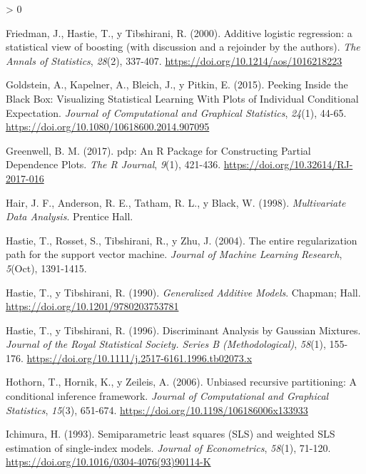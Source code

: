 \documentclass[
  spanish,
]{book}
\theoremstyle{break}
\newlength{\cslhangindent}
\newenvironment{CSLReferences}[2] %
 {%
  \setlength{\parindent}{0pt}
  \ifodd #1 \everypar{\setlength{\hangindent}{\cslhangindent}}\ignorespaces\fi
  \ifnum #2 > 0
  \setlength{\parskip}{#2\baselineskip}
  \fi
 }%
 {}
\theoremstyle{definition}
\theoremstyle{definition}
\theoremstyle{definition}
\theoremstyle{definition}
\theoremstyle{remark}
\begin{document}
\begin{CSLReferences}{1}{0}
\leavevmode\hypertarget{ref-friedman2000additive}{}%
Friedman, J., Hastie, T., y Tibshirani, R. (2000). Additive logistic regression: a statistical view of boosting (with discussion and a rejoinder by the authors). \emph{The Annals of Statistics}, \emph{28}(2), 337-407. \url{https://doi.org/10.1214/aos/1016218223}

\leavevmode\hypertarget{ref-goldstein2015peeking}{}%
Goldstein, A., Kapelner, A., Bleich, J., y Pitkin, E. (2015). Peeking Inside the Black Box: Visualizing Statistical Learning With Plots of Individual Conditional Expectation. \emph{Journal of Computational and Graphical Statistics}, \emph{24}(1), 44-65. \url{https://doi.org/10.1080/10618600.2014.907095}

\leavevmode\hypertarget{ref-greenwell2020dblp}{}%
Greenwell, B. M. (2017). {pdp: An R Package for Constructing Partial Dependence Plots}. \emph{{The R Journal}}, \emph{9}(1), 421-436. \url{https://doi.org/10.32614/RJ-2017-016}

\leavevmode\hypertarget{ref-hair1998multivariate}{}%
Hair, J. F., Anderson, R. E., Tatham, R. L., y Black, W. (1998). \emph{Multivariate Data Analysis}. Prentice Hall.

\leavevmode\hypertarget{ref-hastie2004entire}{}%
Hastie, T., Rosset, S., Tibshirani, R., y Zhu, J. (2004). The entire regularization path for the support vector machine. \emph{Journal of Machine Learning Research}, \emph{5}(Oct), 1391-1415.

\leavevmode\hypertarget{ref-hastie1990generalized}{}%
Hastie, T., y Tibshirani, R. (1990). \emph{Generalized Additive Models}. Chapman; Hall. \url{https://doi.org/10.1201/9780203753781}

\leavevmode\hypertarget{ref-hastie1996fisher}{}%
Hastie, T., y Tibshirani, R. (1996). Discriminant Analysis by Gaussian Mixtures. \emph{Journal of the Royal Statistical Society. Series B (Methodological)}, \emph{58}(1), 155-176. \url{https://doi.org/10.1111/j.2517-6161.1996.tb02073.x}

\leavevmode\hypertarget{ref-hothorn2006unbiased}{}%
Hothorn, T., Hornik, K., y Zeileis, A. (2006). Unbiased recursive partitioning: A conditional inference framework. \emph{Journal of Computational and Graphical Statistics}, \emph{15}(3), 651-674. \url{https://doi.org/10.1198/106186006x133933}

\leavevmode\hypertarget{ref-ichimura1993}{}%
Ichimura, H. (1993). Semiparametric least squares (SLS) and weighted SLS estimation of single-index models. \emph{Journal of Econometrics}, \emph{58}(1), 71-120. \url{https://doi.org/10.1016/0304-4076(93)90114-K}


\end{CSLReferences}
\end{document}

